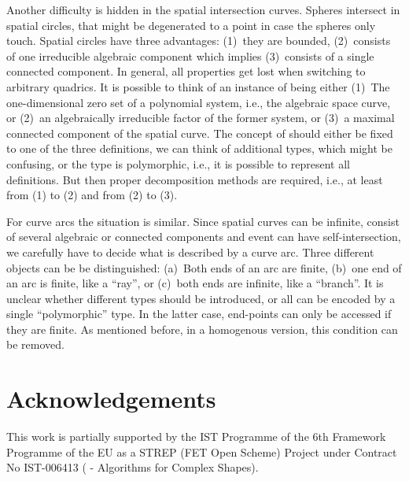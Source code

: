 Another difficulty is hidden in the spatial intersection curves.
Spheres intersect in spatial circles, that might be degenerated
to a point in case the spheres only touch. Spatial circles
have three advantages: (1)~they are bounded, (2)~consists of one irreducible
algebraic component which implies (3)~consists of a single
connected component.
In general, all properties get lost when switching to arbitrary quadrics.
It is possible to think of an instance of  being either
(1)~The one-dimensional zero set of a polynomial
system, i.e., the algebraic space curve, or (2)~an algebraically 
irreducible factor of the former system, or (3)~a maximal connected component
of the spatial curve. 
The concept of  should either be fixed to one of the
three definitions, we can think of additional types, which might be
confusing, or the type is polymorphic, i.e., it is possible
to represent all definitions. But then proper decomposition
methods are required, i.e., at least from (1) to (2) and from (2) to (3).

For curve arcs the situation is similar. Since spatial curves can be infinite,
consist of several algebraic or connected components and event can have 
self-intersection, we carefully have to decide what is described by a curve
arc. Three different objects can be be distinguished: (a)~Both ends of an 
arc are finite, (b)~one end of an arc is finite, like a ``ray'', or 
(c)~both ends are infinite, like a ``branch''. It is unclear
whether different types should be introduced, or
all can be encoded by a single ``polymorphic'' type. In the latter
case, end-points can only be accessed if they are finite. As mentioned before,
in a homogenous version, this condition can be removed.

\section{Acknowledgements}

This work is partially supported by the IST Programme of the 6th
Framework Programme of the EU as a STREP (FET Open Scheme) Project
under Contract No IST-006413 ( -
Algorithms for Complex Shapes).

